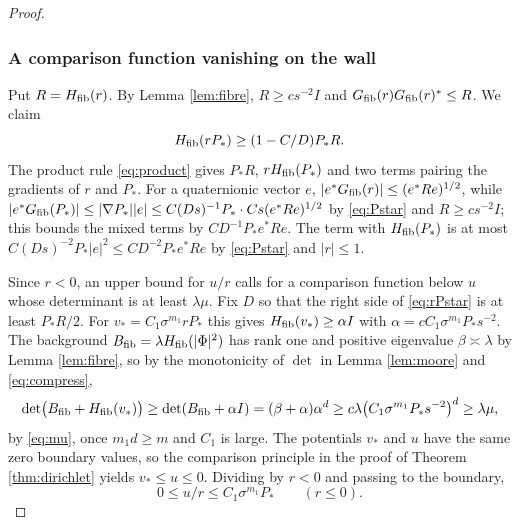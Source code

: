 \begin{proof}
\subsubsection*{A comparison function vanishing on the wall}
Put $R=H_{\mathrm{fib}}(r)$. By Lemma \ref{lem:fibre}, $R\ge cs^{-2}I$ and $G_{\mathrm{fib}}(r)G_{\mathrm{fib}}(r)^*\le R$. We claim
\begin{equation}\label{eq:rPstar}
H_{\mathrm{fib}}(rP_*)\ge(1-C/D)P_*R .
\end{equation}
The product rule \eqref{eq:product} gives $P_*R$, $rH_{\mathrm{fib}}(P_*)$ and two terms pairing the
gradients of $r$ and $P_*$. For a quaternionic vector $e$, $|e^*G_{\mathrm{fib}}(r)|\le(e^*Re)^{1/2}$, while
$|e^*G_{\mathrm{fib}}(P_*)|\le|\nabla P_*||e|\le C(Ds)^{-1}P_*\cdot Cs(e^*Re)^{1/2}$ by \eqref{eq:Pstar} and
$R\ge cs^{-2}I$; this bounds the mixed terms by $CD^{-1}P_*e^*Re$. The term with $H_{\mathrm{fib}}(P_*)$ is at
most $C(Ds)^{-2}P_*|e|^2\le CD^{-2}P_*e^*Re$ by \eqref{eq:Pstar} and $|r|\le1$.

Since $r<0$, an upper bound for $u/r$ calls for a comparison function below $u$ whose
determinant is at least $\lambda\mu$. Fix $D$ so that the right side of \eqref{eq:rPstar} is at
least $P_*R/2$. For $v_*=C_1\sigma^{m_1}rP_*$ this gives $H_{\mathrm{fib}}(v_*)\ge\alpha I$ with
$\alpha=cC_1\sigma^{m_1}P_*s^{-2}$. The background $B_{\rm fib}=\lambda H_{\mathrm{fib}}(|\Phi|^2)$ has rank one
and positive eigenvalue $\beta\asymp\lambda$ by Lemma \ref{lem:fibre}, so by the monotonicity of
$\det$ in Lemma \ref{lem:moore} and \eqref{eq:compress},
\[
\det\bigl(B_{\rm fib}+H_{\mathrm{fib}}(v_*)\bigr)\ge\det(B_{\rm fib}+\alpha I)=(\beta+\alpha)\alpha^d
\ge c\lambda\bigl(C_1\sigma^{m_1}P_*s^{-2}\bigr)^d\ge\lambda\mu ,
\]
by \eqref{eq:mu}, once $m_1d\ge m$ and $C_1$ is large. The potentials $v_*$ and $u$ have the same
zero boundary values, so the comparison principle in the proof of Theorem \ref{thm:dirichlet}
yields $v_*\le u\le0$. Dividing by $r<0$ and passing to the boundary,
\begin{equation}\label{eq:urho}
0\le u/r\le C_1\sigma^{m_1}P_*\qquad(r\le0).
\end{equation}


\end{proof}
